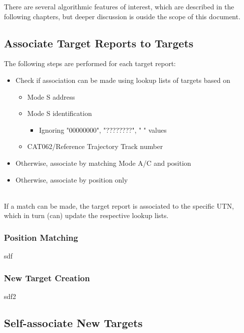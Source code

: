 There are several algorithmic features of interest, which are described in the following chapters, but deeper discussion is ouside the scope of this document.

\subsection{Associate Target Reports to Targets}

The following steps are performed for each target report:
\begin{itemize}
\item Check if association can be made using lookup lists of targets based on
\begin{itemize}
\item Mode S address
\item Mode S identification
\begin{itemize}
\item Ignoring "00000000", "????????", "        " values
\end{itemize}
\item CAT062/Reference Trajectory Track number
\end{itemize}
\item Otherwise, associate by matching Mode A/C and position
\item Otherwise, associate by position only
\end{itemize}
\ \\

If a match can be made, the target report is associated to the specific UTN, which in turn (can) update the respective lookup lists.

\subsubsection{Position Matching}
sdf

\subsubsection{New Target Creation}
sdf2

\subsection{Self-associate New Targets}


